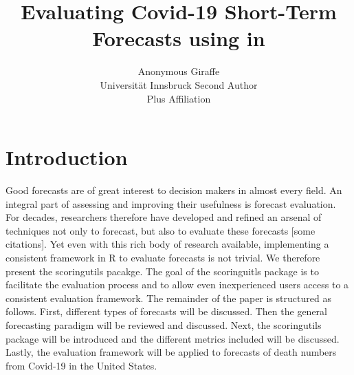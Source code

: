 \documentclass[article]{jss}
\author{Anonymous Giraffe\\Universit\"at Innsbruck \And 
        Second Author\\Plus Affiliation}
\title{Evaluating Covid-19 Short-Term Forecasts using \pkg{scoringutils} in \proglang{R}}
\begin{document}

\section[introduction]{Introduction}
Good forecasts are of great interest to decision makers in almost every field. An integral part of assessing and improving their usefulness is forecast evaluation. For decades, researchers therefore have developed and refined an arsenal of techniques not only to forecast, but also to evaluate these forecasts [some citations]. Yet even with this rich body of research available, implementing a consistent framework in R to evaluate forecasts is not trivial. We therefore present the scoringutils pacakge. The goal of the scoringuitls package is to facilitate the evaluation process and to allow even inexperienced users access to a consistent evaluation framework. The remainder of the paper is structured as follows. First, different types of forecasts will be discussed. Then the general forecasting paradigm will be reviewed and discussed. Next, the scoringutils package will be introduced and the different metrics included will be discussed. Lastly, the evaluation framework will be applied to forecasts of death numbers from Covid-19 in the United States. 
\end{document}
